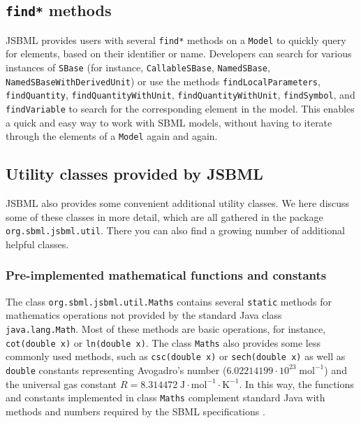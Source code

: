 \subsection{\texttt{find*} methods}

JSBML provides users with several \texttt{find*} methods
%
on a \texttt{Model}
%
to quickly query for elements, based on their identifier or name. Developers can
search for various instances of \texttt{SBase} (for instance,
\texttt{CallableSBase},
%
\texttt{NamedSBase},
%
\texttt{NamedSBaseWithDerivedUnit})
%
or use the methods \texttt{findLocalParameters}, \texttt{findQuantity},
\texttt{findQuantityWithUnit}, \texttt{findQuantityWithUnit},
\texttt{findSymbol}, and \texttt{findVariable} to search for the corresponding
element in the model. This enables a quick and easy way to work with SBML
models, without having to iterate through the elements of a \texttt{Model} again
and again.

\subsection{Utility classes provided by JSBML}

JSBML also provides some convenient additional utility classes. We here discuss
some of these classes in more detail, which are all gathered in
the package \texttt{org.sbml.jsbml.util}. There you can also find a growing
number of additional helpful classes.


\subsubsection{Pre-implemented mathematical functions and constants}

The class \texttt{org.sbml.jsbml.util.Maths}
%
contains several \texttt{static} methods for mathematics operations not provided
by the standard Java class \texttt{java.lang.Math}. Most of these methods are
basic operations, for instance, \texttt{cot(double x)} or \texttt{ln(double x)}.
The class \texttt{Maths} also provides some less commonly used methods,
such as \texttt{csc(double x)} or \texttt{sech(double x)} as well as
\texttt{double} constants representing Avogadro's number ($6.02214199 \cdot
10^{23}\;\mathrm{mol}^{-1}$) and the universal gas constant
$R = 8.314472\;\mathrm{J}\cdot\mathrm{mol}^{-1}\cdot\mathrm{K}^{-1}$. In this
way, the functions and constants implemented in class \texttt{Maths} complement
standard Java with methods and numbers required by the SBML specifications
\citep{Hucka2003, Hucka2008, Hucka2010a}.

